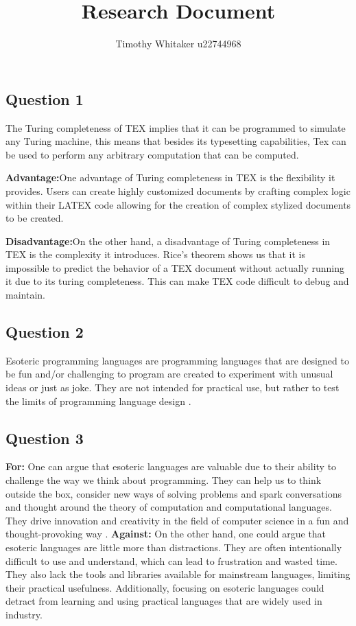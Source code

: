 \documentclass{article}
\title{Research Document}
\author{Timothy Whitaker u22744968}
\begin{document}
\maketitle

\subsection*{Question 1}

The Turing completeness of TEX implies that it can be programmed to simulate any Turing machine, this means that besides its typesetting capabilities, Tex can be used to perform any arbitrary computation that can be computed.

\textbf{Advantage:}One advantage of Turing completeness in TEX is the flexibility it provides. 
Users can create highly customized documents by crafting complex logic within their LATEX code allowing for the creation of complex stylized documents to be created.

\textbf{Disadvantage:}On the other hand, a disadvantage of Turing completeness in TEX is the complexity it introduces. 
Rice's theorem\cite{wikipedia2022rices} shows us that it is impossible to predict the behavior of a TEX document without actually running it due to its turing completeness. This can make TEX code difficult to debug and maintain.

\subsection*{Question 2}

Esoteric programming languages are programming languages that are designed to be fun and/or challenging to program are created to experiment with unusual ideas or just as joke. 
They are not intended for practical use, but rather to test the limits of programming language design \cite{esolangs2022esoteric}.

\subsection*{Question 3}

\textbf{For:} One can argue that esoteric languages are valuable due to their ability to challenge the way we think about programming. 
They can help us to think outside the box, consider new ways of solving problems and spark conversations and thought around the theory of computation and computational languages.
They drive innovation and creativity in the field of computer science in a fun and thought-provoking way \cite{esolangs2022esoteric}.
\textbf{Against:} On the other hand, one could argue that esoteric languages are little more than distractions. 
They are often intentionally difficult to use and understand, which can lead to frustration and wasted time. 
They also lack the tools and libraries available for mainstream languages, limiting their practical usefulness. 
Additionally, focusing on esoteric languages could detract from learning and using practical languages that are widely used in industry.
\end{document}
